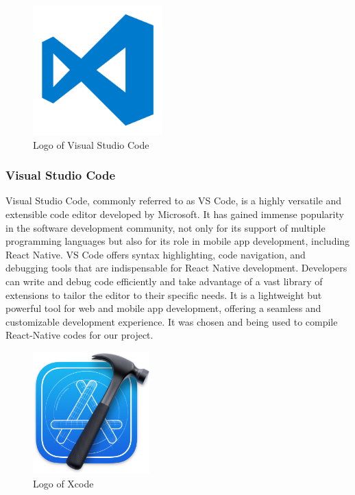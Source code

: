 \documentclass[conference]{IEEEtran}
\begin{document}
        \begin{figure}[htbp]
        \centerline{\includegraphics[width=5cm]{Images/logo/vsc.png}}
        \label{fig}
        \caption{Logo of Visual Studio Code}
        \end{figure}
        \subsubsection{Visual Studio Code}
        Visual Studio Code, commonly referred to as VS Code, is a highly versatile and extensible code editor developed by Microsoft. It has gained immense popularity in the software development community, not only for its support of multiple programming languages but also for its role in mobile app development, including React Native. VS Code offers syntax highlighting, code navigation, and debugging tools that are indispensable for React Native development. Developers can write and debug code efficiently and take advantage of a vast library of extensions to tailor the editor to their specific needs. It is a lightweight but powerful tool for web and mobile app development, offering a seamless and customizable development experience. It was chosen and being used to compile React-Native codes for our project.\\
    
    
        \begin{figure}[htbp]
        \centerline{\includegraphics[width=4.5cm]{Images/logo/xcode.png}}
        \label{fig}
        \caption{Logo of Xcode}
        \end{figure}
\end{document}
